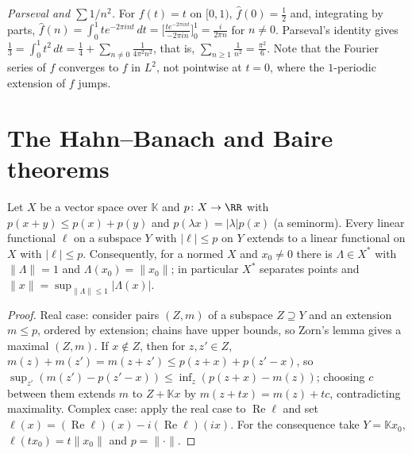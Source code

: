 \begin{example}\label{functional-analysis:example-basel}
\emph{Parseval and $\sum 1/n^2$.} For $f(t) = t$ on $[0, 1)$, $\hat f(0) = \frac12$ and, integrating by parts, $\hat f(n) = \int_0^1te^{-2\pi int}\,dt = \bigl[\frac{te^{-2\pi int}}{-2\pi in}\bigr]_0^1 = \frac{i}{2\pi n}$
for $n \neq 0$. Parseval's identity gives $\frac13 = \int_0^1t^2\,dt = \frac14 + \sum_{n \neq 0}\frac{1}{4\pi^2n^2}$, that is, $\sum_{n \geq 1}\frac1{n^2} = \frac{\pi^2}6$. Note that the Fourier series of $f$
converges to $f$ in $L^2$, not pointwise at $t = 0$, where the $1$-periodic extension of $f$ jumps.
\end{example}

\section{The Hahn--Banach and Baire theorems}\label{functional-analysis:section-hahn-banach}

\begin{theorem}\label{functional-analysis:theorem-hahn-banach}
Let $X$ be a vector space over $\mathbb{K}$ and $p \colon X \to \RR$ with $p(x + y) \leq p(x) + p(y)$ and $p(\lambda x) = |\lambda|p(x)$ (a seminorm). Every linear functional $\ell$ on a subspace $Y$ with
$|\ell| \leq p$ on $Y$ extends to a linear functional on $X$ with $|\ell| \leq p$. Consequently, for a normed $X$ and $x_0 \neq 0$ there is $\Lambda \in X^*$ with $\|\Lambda\| = 1$ and $\Lambda(x_0) = \|x_0\|$;
in particular $X^*$ separates points and $\|x\| = \sup_{\|\Lambda\| \leq 1}|\Lambda(x)|$.
\end{theorem}

\begin{proof}
Real case: consider pairs $(Z, m)$ of a subspace $Z \supseteq Y$ and an extension $m \leq p$, ordered by extension; chains have upper bounds, so Zorn's lemma gives a maximal $(Z, m)$. If $x \notin Z$, then for
$z, z' \in Z$, $m(z) + m(z') = m(z + z') \leq p(z + x) + p(z' - x)$, so $\sup_{z'}(m(z') - p(z' - x)) \leq \inf_z(p(z + x) - m(z))$; choosing $c$ between them extends $m$ to $Z + \mathbb{K}x$ by $m(z + tx) = m(z) + tc$,
contradicting maximality. Complex case: apply the real case to $\operatorname{Re}\ell$ and set $\ell(x) = (\operatorname{Re}\ell)(x) - i(\operatorname{Re}\ell)(ix)$. For the consequence take
$Y = \mathbb{K}x_0$, $\ell(tx_0) = t\|x_0\|$ and $p = \|\cdot\|$.
\end{proof}

